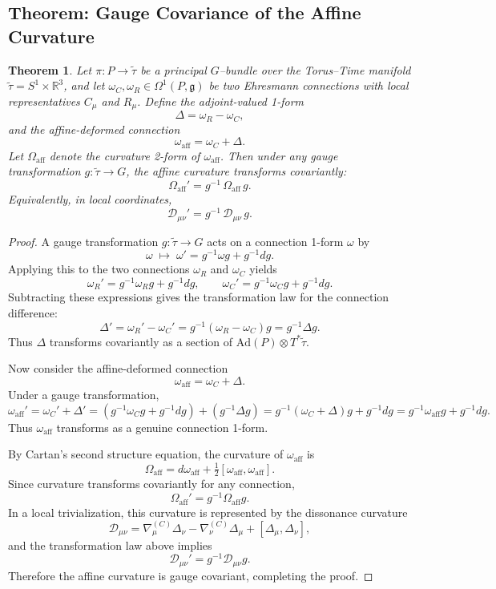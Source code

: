\documentclass[12pt,openany]{book}
\theoremstyle{plain}
\newtheorem{theorem}{Theorem}[chapter]
\theoremstyle{definition}
\theoremstyle{remark}
\begin{document}
\subsection*{Theorem: Gauge Covariance of the Affine Curvature}

\begin{theorem}
Let $\pi : P \to \tilde{\tau}$ be a principal $G$--bundle over the
Torus--Time manifold $\tilde{\tau} = S^1 \times \mathbb{R}^3$, and let
$\omega_C, \omega_R \in \Omega^1(P,\mathfrak{g})$ be two Ehresmann
connections with local representatives $C_\mu$ and $R_\mu$. Define the
adjoint-valued 1-form
\[
\Delta = \omega_R - \omega_C,
\]
and the affine-deformed connection 
\[
\omega_{\mathrm{aff}} = \omega_C + \Delta.
\]
Let $\Omega_{\mathrm{aff}}$ denote the curvature 2-form of
$\omega_{\mathrm{aff}}$. Then under any gauge transformation
$g : \tilde{\tau} \to G$, the affine curvature transforms covariantly:
\[
\Omega_{\mathrm{aff}}' = g^{-1}\,\Omega_{\mathrm{aff}}\, g.
\]
Equivalently, in local coordinates,
\[
\mathcal{D}_{\mu\nu}' = g^{-1}\,\mathcal{D}_{\mu\nu}\, g.
\]
\end{theorem}

\begin{proof}
A gauge transformation $g : \tilde{\tau} \to G$ acts on a connection
1-form $\omega$ by
\[
\omega \;\mapsto\; \omega' = g^{-1}\omega g + g^{-1}dg.
\]
Applying this to the two connections $\omega_R$ and $\omega_C$ yields
\[
\omega_R' = g^{-1}\omega_R g + g^{-1}dg,
\qquad
\omega_C' = g^{-1}\omega_C g + g^{-1}dg.
\]
Subtracting these expressions gives the transformation law for the
connection difference:
\[
\Delta' = \omega_R' - \omega_C'
= g^{-1}(\omega_R - \omega_C)g
= g^{-1}\Delta g.
\]
Thus $\Delta$ transforms covariantly as a section of
$\mathrm{Ad}(P) \otimes T^*\tilde{\tau}$.

Now consider the affine-deformed connection
\[
\omega_{\mathrm{aff}} = \omega_C + \Delta.
\]
Under a gauge transformation,
\[
\omega_{\mathrm{aff}}'
= \omega_C' + \Delta'
= \left(g^{-1}\omega_C g + g^{-1}dg\right)
  + \left(g^{-1}\Delta g\right)
= g^{-1}(\omega_C + \Delta)g + g^{-1}dg
= g^{-1}\omega_{\mathrm{aff}} g + g^{-1}dg.
\]
Thus $\omega_{\mathrm{aff}}$ transforms as a genuine connection 1-form.

By Cartan's second structure equation, the curvature of
$\omega_{\mathrm{aff}}$ is
\[
\Omega_{\mathrm{aff}}
= d\omega_{\mathrm{aff}}
+ \tfrac{1}{2}[\omega_{\mathrm{aff}},\omega_{\mathrm{aff}}].
\]
Since curvature transforms covariantly for any connection,
\[
\Omega_{\mathrm{aff}}'
= g^{-1}\Omega_{\mathrm{aff}} g.
\]
In a local trivialization, this curvature is represented by the
dissonance curvature
\[
\mathcal{D}_{\mu\nu}
= \nabla_\mu^{(C)}\Delta_\nu
- \nabla_\nu^{(C)}\Delta_\mu
+ [\Delta_\mu,\Delta_\nu],
\]
and the transformation law above implies
\[
\mathcal{D}_{\mu\nu}' = g^{-1}\mathcal{D}_{\mu\nu}g.
\]
Therefore the affine curvature is gauge covariant, completing the proof.
\end{proof}
\end{document}

